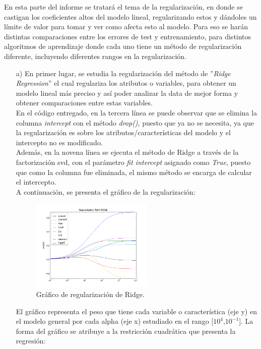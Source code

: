 \documentclass[10pt]{article}
\begin{document}
En esta parte del informe se tratará el tema de la regularización, en donde se castigan los coeficientes altos del modelo lineal, regularizando estos y dándoles un límite de valor para tomar y ver como afecta esto al modelo. Para eso se harán distintas comparaciones entre los errores de test y entrenamiento, para distintos algoritmos de aprendizaje donde cada uno tiene un método de regularización diferente, incluyendo diferentes rangos en la regularización.
\begin{itemize}

\item[a)] En primer lugar, se estudia la regularización del método de ''\textit{Ridge Regression}'' el cual regulariza los atributos o variables, para obtener un modelo lineal más preciso y así poder analizar la data de mejor forma y obtener comparaciones entre estas variables.\\
En el código entregado, en la tercera línea se puede observar que se elimina la columna \textit{ intercept} con el método \textit{drop()}, puesto que ya no se necesita, ya que la regularización es sobre los atributos/características del modelo y el intercepto no es modificado.\\
Además, en la novena línea se ejecuta el método de Ridge a través de la factorización svd, con el parámetro \textit{fit intercept} asignado como \textit{True}, puesto que como la columna fue eliminada, el mismo método se encarga de calcular el intercepto.\\

A continuación, se presenta el gráfico de la regularización:\\

\begin{figure}[!htb]
   \centering
   \includegraphics[width=0.55\textwidth]{images/regularization_ridge}
   \caption{Gráfico de regularización de Ridge.}
   \label{ridge}
\end{figure}

El gráfico representa el peso que tiene cada variable o característica (eje y) en el modelo general por cada alpha (eje x) estudiado en el rango [$10^4$,$10^{-1}$]. La forma del gráfico se atribuye a la restricción cuadrática que presenta la regresión:


\end{itemize}
\end{document}

